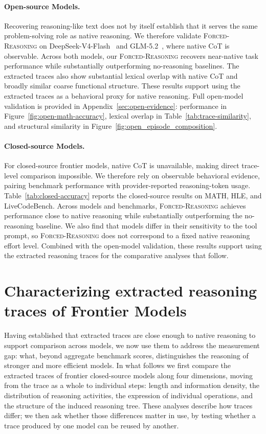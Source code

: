\documentclass[10pt,letterpaper]{article}
\newcommand{\method}{\textsc{Forced-Reasoning}}
\begin{document}
\paragraph{Open-source Models.}
Recovering reasoning-like text does not by itself establish that it serves the
same problem-solving role as native reasoning.
We therefore validate \method{} on DeepSeek-V4-Flash~\citep{deepseekai2026deepseekv4}
and GLM-5.2~\citep{glm5team2026glm5vibecodingagentic}, where native CoT is observable.
Across both models, our \method{} recovers near-native task performance while
substantially outperforming no-reasoning baselines.
The extracted traces also show substantial lexical overlap with native CoT and
broadly similar coarse functional structure.
These results support using the extracted traces as a behavioral proxy
for native reasoning.
Full open-model validation is provided in Appendix~\ref{sec:open-evidence}:
performance in Figure~\ref{fig:open-math-accuracy},
lexical overlap in Table~\ref{tab:trace-similarity},
and structural similarity in Figure~\ref{fig:open_episode_composition}.


\paragraph{Closed-source Models.}
For closed-source frontier models, native CoT is unavailable, making direct trace-level comparison impossible. We therefore rely on observable behavioral evidence, pairing benchmark performance with provider-reported reasoning-token usage. Table~\ref{tab:closed-accuracy} reports the closed-source results on MATH, HLE, and LiveCodeBench. Across models and benchmarks, \method{} achieves performance close to native reasoning while substantially outperforming the no-reasoning baseline. We also find that models differ in their sensitivity to the tool prompt, so \method{} does not correspond to a fixed native reasoning effort level. Combined with the open-model validation, these results support using the extracted reasoning traces for the comparative analyses that follow.




\section{Characterizing extracted reasoning traces of Frontier Models}
\label{sec:token-efficient}
Having established that extracted traces are close enough to native reasoning to
support comparison across models, we now use them to
address the measurement gap: what, beyond aggregate benchmark scores,
distinguishes the reasoning of stronger and more efficient models.   In what follows
we first compare the extracted traces of frontier closed-source models along four
dimensions, moving from the trace as a whole to individual steps: length and
information density, the distribution of reasoning activities, the expression of
individual operations, and the structure of the induced reasoning tree. These
analyses describe how traces differ; we then ask whether those differences matter
in use, by testing whether a trace produced by one model can be reused by another.
\end{document}
